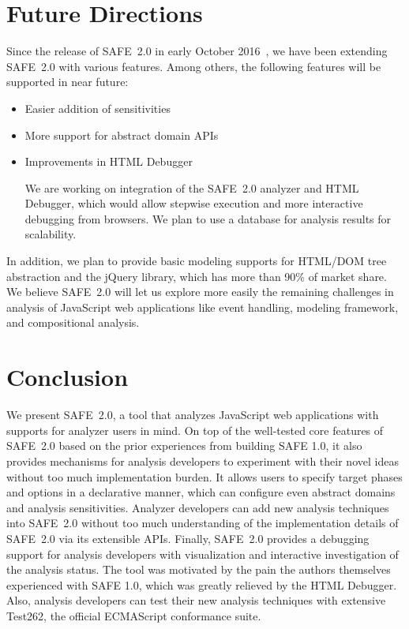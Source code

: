 \documentclass[10pt, conference]{IEEEtran}
\newcommand{\oldsafe}{{SAFE 1.0}\xspace}
\newcommand{\safe}{{SAFE~2.0}\xspace}
\newcommand{\htmldebug}{{\sf\small HTML Debugger}\xspace}
\begin{document}
\section{Future Directions}
Since the release of \safe in early October 2016~\cite{saferelease},
we have been extending \safe with various features.
Among others, the following features will be supported in near future:
\begin{itemize}
\item Easier addition of sensitivities 
\item More support for abstract domain APIs
\item Improvements in \htmldebug

We are working on integration of the \safe analyzer and \htmldebug,
which would allow stepwise execution and more interactive debugging from browsers.
We plan to use a database for analysis results for scalability.
\end{itemize}
In addition, we plan to provide basic modeling supports for HTML/DOM
tree abstraction and the jQuery library, which has more than 90\% of
market share.  We believe \safe will let us explore more easily
the remaining challenges in analysis of JavaScript web applications
like event handling, modeling framework, and compositional analysis.


\section{Conclusion}
We present \safe, a tool that analyzes JavaScript web applications with
supports for analyzer users in mind.  On top of the well-tested core
features of \safe based on the prior experiences from building \oldsafe,
it also provides mechanisms for analysis developers to experiment with
their novel ideas without too much implementation burden.
It allows users to specify target phases and options in a declarative
manner, which can configure even abstract domains and analysis
sensitivities.  Analyzer developers can add new analysis techniques
into \safe without too much understanding of the implementation details
of \safe via its extensible APIs.  Finally, \safe provides a debugging
support for analysis developers with visualization and interactive
investigation of the analysis status.  The tool was motivated by the pain
the authors themselves experienced with \oldsafe, which was greatly
relieved by the \htmldebug.  Also, analysis developers can test their
new analysis techniques with extensive Test262, the official ECMAScript
conformance suite.



\end{document}
